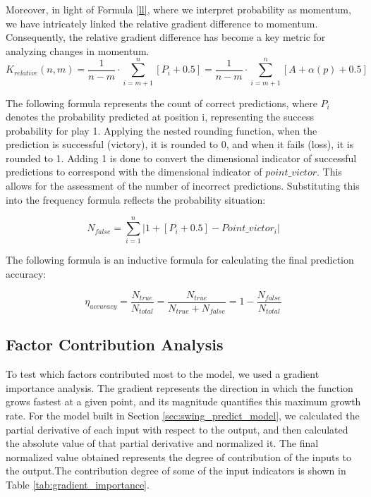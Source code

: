Moreover, in light of Formula \ref{ll}, where we interpret probability as momentum, we have intricately linked the relative gradient difference to momentum. Consequently, the relative gradient difference has become a key metric for analyzing changes in momentum.
\begin{equation}
\label{eq:formula25}
K_{relative}{(n, m)} = \frac{1}{n-m} \cdot \sum_{i=m+1}^{n} [P_i + 0.5] = \frac{1}{n-m} \cdot \sum_{i=m+1}^{n} [A+\alpha (p) + 0.5]
\end{equation}

The following formula represents the count of correct predictions, where \(P_i\) denotes the probability predicted at position i, representing the success probability for play 1. Applying the nested rounding function, when the prediction is successful (victory), it is rounded to 0, and when it fails (loss), it is rounded to 1. Adding 1 is done to convert the dimensional indicator of successful predictions to correspond with the dimensional indicator of \(point\_victor\). This allows for the assessment of the number of incorrect predictions. Substituting this into the frequency formula reflects the probability situation:

\begin{equation}
\label{eq:formula26}
N_{false}=\sum_{i=1}^{n}|1+[P_{i}+0.5]-Point\_victor_i|\end{equation}

The following formula is an inductive formula for calculating the final prediction accuracy:

\begin{equation}
\label{eq:formula27}
\eta_{accuracy}=\frac{N_{true}}{N_{total}}=\frac{N_{true}}{N_{true}+N_{false}} = 1-\frac{N_{false}}{N_{total}}
\end{equation}

\subsection{Factor Contribution Analysis}\label{sec:factor_contribution}
To test which factors contributed most to the model, we used a gradient importance analysis. The gradient represents the direction in which the function grows fastest at a given point, and its magnitude quantifies this maximum growth rate. For the model built in Section \ref{sec:swing_predict_model}, we calculated the partial derivative of each input with respect to the output, and then calculated the absolute value of that partial derivative and normalized it. The final normalized value obtained represents the degree of contribution of the inputs to the output.The contribution degree of some of the input indicators is shown in Table \ref{tab:gradient_importance}.


